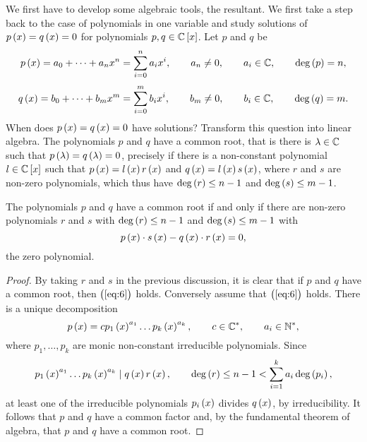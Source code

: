 We first have to develop some algebraic tools, the resultant. We first take a step back to the case of polynomials in one variable and study solutions of $ p\br{x} = q\br{x} = 0 $ for polynomials $ p, q \in \C\sbr{x} $. Let $ p $ and $ q $ be
$$ p\br{x} = a_0 + \dots + a_nx^n = \sum_{i = 0}^n a_ix^i, \qquad a_n \ne 0, \qquad a_i \in \C, \qquad \deg\br{p} = n, $$
$$ q\br{x} = b_0 + \dots + b_mx^m = \sum_{i = 0}^m b_ix^i, \qquad b_m \ne 0, \qquad b_i \in \C, \qquad \deg\br{q} = m. $$
When does $ p\br{x} = q\br{x} = 0 $ have solutions? Transform this question into linear algebra. The polynomials $ p $ and $ q $ have a common root, that is there is $ \lambda \in \mathbb{C} $ such that $ p\br{\lambda} = q\br{\lambda} = 0 $, precisely if there is a non-constant polynomial $ l \in \C\sbr{x} $ such that $ p\br{x} = l\br{x}r\br{x} $ and $ q\br{x} = l\br{x}s\br{x} $, where $ r $ and $ s $ are non-zero polynomials, which thus have $ \deg\br{r} \le n - 1 $ and $ \deg\br{s} \le m - 1 $.

\begin{lemma}
\label{lem:9.1}
The polynomials $ p $ and $ q $ have a common root if and only if there are non-zero polynomials $ r $ and $ s $ with $ \deg\br{r} \le n - 1 $ and $ \deg\br{s} \le m - 1 $ with
\begin{equation}
\label{eq:6}
p\br{x} \cdot s\br{x} - q\br{x} \cdot r\br{x} = 0,
\end{equation}
the zero polynomial.
\end{lemma}

\begin{proof}
By taking $ r $ and $ s $ in the previous discussion, it is clear that if $ p $ and $ q $ have a common root, then $ \br{\ref{eq:6}} $ holds. Conversely assume that $ \br{\ref{eq:6}} $ holds. There is a unique decomposition
$$ p\br{x} = cp_1\br{x}^{a_1} \dots p_k\br{x}^{a_k}, \qquad c \in \C^*, \qquad a_i \in \N^*, $$
where $ p_1, \dots, p_k $ are monic non-constant irreducible polynomials. Since
$$ p_1\br{x}^{a_1} \dots p_k\br{x}^{a_k} \mid q\br{x}r\br{x}, \qquad \deg\br{r} \le n - 1 < \sum_{i = 1}^k a_i \deg\br{p_i}, $$
at least one of the irreducible polynomials $ p_i\br{x} $ divides $ q\br{x} $, by irreducibility. It follows that $ p $ and $ q $ have a common factor and, by the fundamental theorem of algebra, that $ p $ and $ q $ have a common root.
\end{proof}

\pagebreak

